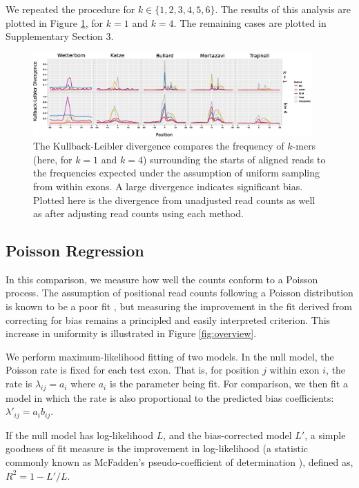 \documentclass{bioinfo}
\begin{document}
We repeated the procedure for $k \in \{1, 2, 3, 4, 5, 6\}$. The results of this
analysis are plotted in Figure \ref{fig:kl}, for $k = 1$ and $k = 4$. The
remaining cases are plotted in Supplementary Section 3.

\begin{figure}
\centerline{\includegraphics[width=0.95\textwidth]{kl.eps}}
\caption{The Kullback-Leibler divergence compares the frequency of $k$-mers
(here, for $k = 1$ and $k = 4$) surrounding the starts of aligned reads to the
frequencies expected under the assumption of uniform sampling from within exons.
A large divergence indicates significant bias. Plotted here is the divergence
from unadjusted read counts as well as after adjusting read counts using each
method.}
\label{fig:kl}
\end{figure}


\subsection{Poisson Regression}

In this comparison, we measure how well the counts conform to a Poisson process.
The assumption of positional read counts following a Poisson distribution is
known to be a poor fit \citep{Srivastava2010}, but measuring the improvement in
the fit derived from correcting for bias remains a principled and easily
interpreted criterion. This increase in uniformity is illustrated in Figure
\ref{fig:overview}.

We perform maximum-likelihood fitting of two models. In the null model, the
Poisson rate is fixed for each test exon. That is, for position $j$ within exon $i$,
the rate is $ \lambda_{ij} = a_i $ where $a_i$ is the parameter being fit. For
comparison, we then fit a model in which the rate is also proportional to the
predicted bias coefficients: $ \lambda'_{ij} = a_i b_{ij} $.

If the null model has log-likelihood $L$, and the bias-corrected model $L'$, a
simple goodness of fit measure is the improvement in log-likelihood (a statistic
commonly known as McFadden's pseudo-coefficient of determination
\citep{McFadden1974}), defined as,
$R^2 = 1 - L'/L$.
\end{document}
